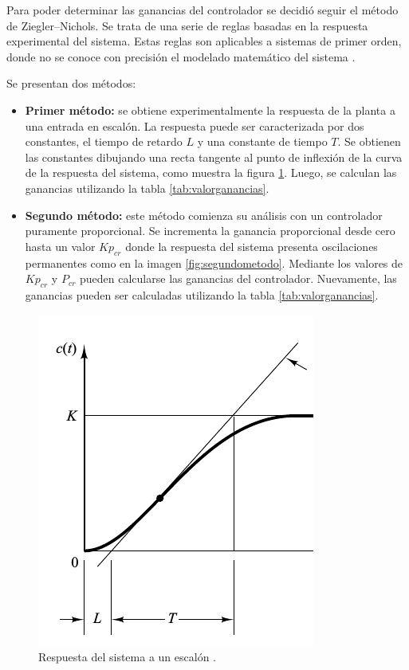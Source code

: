 Para poder determinar las ganancias del controlador se decidió seguir el método
de Ziegler–Nichols.
Se trata de una serie de reglas basadas en la respuesta experimental
del sistema.
Estas reglas son aplicables a sistemas de primer orden, donde no se conoce con
precisión el modelado matemático del sistema \cite{bib:Ogata}.

Se presentan dos métodos:
\begin{itemize}
 \item \textbf{Primer método:} se obtiene experimentalmente la respuesta de la
planta a una entrada en escalón.
 La respuesta puede ser caracterizada por dos constantes, el tiempo de retardo
$L$ y una constante de tiempo $T$.
Se obtienen las constantes dibujando
una recta tangente al  punto de inflexión de la curva de la respuesta del
sistema, como muestra la figura \ref{fig:primermetodo}.
Luego, se calculan las ganancias utilizando la tabla \ref{tab:valorganancias}.

 \item \textbf{Segundo método:}
 este método comienza su análisis con un controlador puramente proporcional.
 Se incrementa  la ganancia proporcional desde cero hasta un valor $Kp_{cr} $
donde la respuesta del  sistema presenta oscilaciones permanentes como en la
imagen \ref{fig:segundometodo}.
 Mediante los valores de $Kp_{cr} $ y $P_{cr}$ pueden calcularse las ganancias
del controlador.
Nuevamente, las ganancias pueden ser calculadas utilizando la tabla
\ref{tab:valorganancias}.
\end{itemize}

\begin{figure}[ht]
 \centering
 \includegraphics[scale=0.5]{Cap4-ProgramacionPLC/images/primermetodo.png}
 \caption{Respuesta del sistema a un escalón \cite{bib:Ogata}.}
 \label{fig:primermetodo}
\end{figure}

